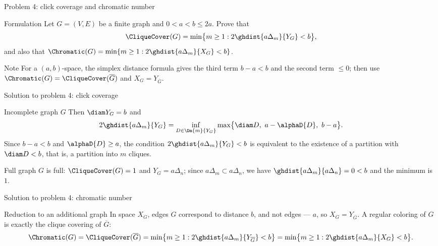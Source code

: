 \documentclass[aspectratio=169,11pt]{beamer}
\begin{document}
\begin{frame}{Problem \textup{4}: click coverage and chromatic number}
\begin{block}{Formulation}
Let $G = (V,E)$ be a finite graph and $0 < a < b \le 2a$. Prove that
\[
\CliqueCover(G) = \min\bigl\{ m \ge 1 : 2 \ghdist{a\Delta_m}{Y_G} < b \bigr\},
\]
and also that $\Chromatic(G) = \min\{ m \ge 1 : 2\ghdist{a\Delta_m}{X_G} < b\}$.
\end{block}
\begin{block}{Note}
For a $(a,b)$-space, the simplex distance formula gives the third term $b-a<b$ and the second term $\le 0$\textup{;} then use $\Chromatic(G) = \CliqueCover(\overline{G})$ and $X_G = Y_{\overline{G}}$.
\end{block}
\end{frame}

\begin{frame}{Solution to problem \textup{4}: click coverage}
\begin{block}{Incomplete graph $G$}
Then $\diam Y_G = b$ and
\[
2 \ghdist{a\Delta_m}{Y_G} = \inf_{D \in \Dm{m}{Y_G}} \max\bigl\{\diam D,\ a - \alphaD{D},\ b - a\bigr\}.
\]
Since $b - a < b$ and $\alphaD{D} \ge a$, the condition $2\ghdist{a\Delta_m}{Y_G} < b$ is equivalent to the existence of a partition with $\diam D < b$, that is, a partition into $m$ cliques.
\end{block}
\begin{block}{Full graph}
$G$ is full: $\CliqueCover(G) = 1$ and $Y_G = a\Delta_n$\textup{;} since $a\Delta_m \subset a\Delta_n$, we have $\ghdist{a\Delta_m}{a\Delta_n} = 0 < b$ and the minimum is $1$.
\end{block}
\end{frame}

\begin{frame}{Solution to problem \textup{4}: chromatic number}
\begin{block}{Reduction to an additional graph}
In space $X_G$, edges $G$ correspond to distance $b$, and not edges --- $a$, so $X_G = Y_{\overline{G}}$. A regular coloring of $G$ is exactly the clique covering of $\overline{G}$:
\[
\Chromatic(G) = \CliqueCover(\overline{G}) = \min\bigl\{ m \ge 1 : 2 \ghdist{a\Delta_m}{Y_{\overline{G}}} < b \bigr\}
= \min\bigl\{ m \ge 1 : 2 \ghdist{a\Delta_m}{X_G} < b \bigr\}.
\]
\end{block}
\end{frame}
\end{document}
